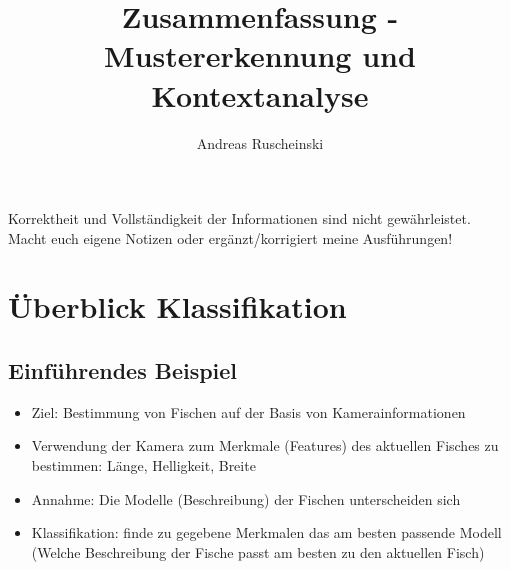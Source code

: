 \documentclass{article} %
\title{Zusammenfassung - Mustererkennung und Kontextanalyse}
\author{
	Andreas Ruscheinski
}
\theoremstyle{definition}
\begin{document}
\maketitle
\begin{framed}Korrektheit und Vollständigkeit der Informationen sind nicht gewährleistet.
Macht euch eigene Notizen oder ergänzt/korrigiert meine Ausführungen!
\end{framed}
\setcounter{tocdepth}{1}
\tableofcontents

\section{Überblick Klassifikation}
	\subsection{Einführendes Beispiel}
	\begin{itemize}
		\item Ziel: Bestimmung von Fischen auf der Basis von Kamerainformationen
		\item Verwendung der Kamera zum Merkmale (Features) des aktuellen Fisches zu bestimmen: Länge, Helligkeit, Breite
		\item Annahme: Die Modelle (Beschreibung) der Fischen unterscheiden sich
		\item Klassifikation: finde zu gegebene Merkmalen das am besten passende Modell (Welche Beschreibung der Fische passt am besten zu den aktuellen Fisch)
	\end{itemize}
\end{document}
